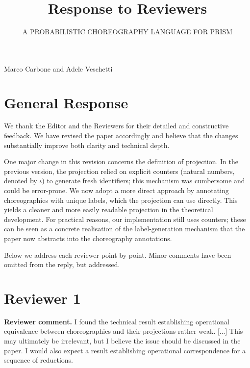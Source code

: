 \documentclass[11pt]{article}
\newcommand{\revcomment}[1]{%
  \begin{reviewercomment}
  \textbf{Reviewer comment.} #1
  \end{reviewercomment}
}
\begin{document}
\title{Response to Reviewers}
\author{A PROBABILISTIC CHOREOGRAPHY LANGUAGE FOR PRISM}
\date{}
\maketitle
\vspace{-0.5\baselineskip}
\begin{center}
{\large Marco Carbone and Adele Veschetti}
\end{center}

\section*{General Response}

We thank the Editor and the Reviewers for their detailed and
constructive feedback. We have revised the paper accordingly and
believe that the changes substantially improve both clarity and
technical depth.

One major change in this revision concerns the definition of
projection. In the previous version, the projection relied on explicit
counters (natural numbers, denoted by $\iota$) to generate fresh
identifiers; this mechanism was cumbersome and could be
error-prone. We now adopt a more direct approach by annotating
choreographies with unique labels, which the projection can use
directly. This yields a cleaner and more easily readable projection in
the theoretical development. For practical reasons, our implementation
still uses counters; these can be seen as a concrete realisation of
the label-generation mechanism that the paper now abstracts into the
choreography annotations.

Below we address each reviewer point by point. Minor comments have
been omitted from the reply, but addressed.


\newpage

\section*{Reviewer 1}


\revcomment{
I found the technical result establishing operational equivalence between choreographies
and their projections rather weak. [...] This may ultimately be irrelevant, but I believe the issue should be discussed in the paper. I would also expect a result establishing
operational correspondence for a sequence of reductions.
}
\end{document}
